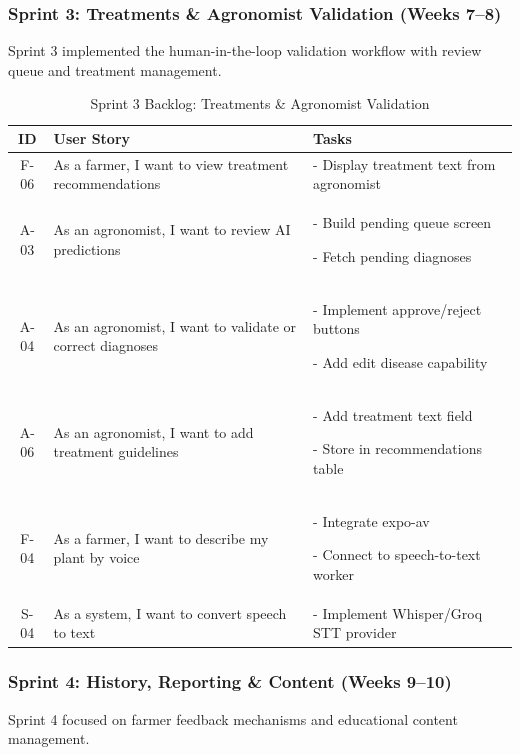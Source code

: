 \documentclass[12pt]{article}
\begin{document}
\subsubsection*{Sprint 3: Treatments \& Agronomist Validation (Weeks 7--8)}
Sprint 3 implemented the human-in-the-loop validation workflow with review queue and treatment management.

\begin{table}[H]
\centering
\caption{Sprint 3 Backlog: Treatments \& Agronomist Validation}
\label{tab:sprint3}
\begin{tabular}{|c|p{8cm}|p{8cm}|}
\hline
\textbf{ID} & \textbf{User Story} & \textbf{Tasks} \\
\hline
F-06 & As a farmer, I want to view treatment recommendations & - Display treatment text from agronomist \\
\hline
A-03 & As an agronomist, I want to review AI predictions & - Build pending queue screen \par - Fetch pending diagnoses \\
\hline
A-04 & As an agronomist, I want to validate or correct diagnoses & - Implement approve/reject buttons \par - Add edit disease capability \\
\hline
A-06 & As an agronomist, I want to add treatment guidelines & - Add treatment text field \par - Store in recommendations table \\
\hline
F-04 & As a farmer, I want to describe my plant by voice & - Integrate expo-av \par - Connect to speech-to-text worker \\
\hline
S-04 & As a system, I want to convert speech to text & - Implement Whisper/Groq STT provider \\
\hline
\end{tabular}
\end{table}

\subsubsection*{Sprint 4: History, Reporting \& Content (Weeks 9--10)}
Sprint 4 focused on farmer feedback mechanisms and educational content management.
\end{document}
